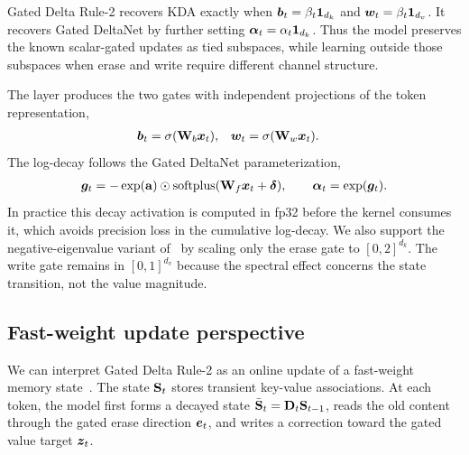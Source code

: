 \documentclass[10pt, logo, onecolumn, copyright]{nv}
\begin{document}
Gated Delta Rule-2 recovers KDA exactly when ${\bm{b}}_t = \beta_t\mathbf{1}_{d_k}$ and ${\bm{w}}_t = \beta_t\mathbf{1}_{d_v}$. It recovers Gated DeltaNet by further setting ${\bm{\alpha}}_t = \alpha_t\mathbf{1}_{d_k}$. Thus the model preserves the known scalar-gated updates as tied subspaces, while learning outside those subspaces when erase and write require different channel structure.

The layer produces the two gates with independent projections of the token representation,
\begin{align}
    {\bm{b}}_t &= \sigma(\mathbf{W}_b{\bm{x}}_t),
    &
    {\bm{w}}_t &= \sigma(\mathbf{W}_w{\bm{x}}_t) .
\label{eq_gdn2_gate_param}
\end{align}
The log-decay follows the Gated DeltaNet parameterization,
\begin{align}
    \boldsymbol{g}_t
    = -\exp(\mathbf{a}) \odot \operatorname{softplus}(\mathbf{W}_f{\bm{x}}_t + \boldsymbol{\delta}),
    \qquad
    {\bm{\alpha}}_t = \exp(\boldsymbol{g}_t) .
\label{eq_gdn2_decay_param}
\end{align}
In practice this decay activation is computed in fp32 before the kernel consumes it, which avoids precision loss in the cumulative log-decay. We also support the negative-eigenvalue variant of~\citep{Grazzi2024UnlockingSI} by scaling only the erase gate to $[0,2]^{d_k}$. The write gate remains in $[0,1]^{d_v}$ because the spectral effect concerns the state transition, not the value magnitude.

\subsection{Fast-weight update perspective}

We can interpret Gated Delta Rule-2 as an online update of a fast-weight memory state~\citep{longhorn}. The state ${\mathbf{S}}_t$ stores transient key-value associations. At each token, the model first forms a decayed state $\bar{{\mathbf{S}}}_t={\mathbf{D}}_t{\mathbf{S}}_{t-1}$, reads the old content through the gated erase direction ${\bm{e}}_t$, and writes a correction toward the gated value target ${\bm{z}}_t$.
\end{document}
